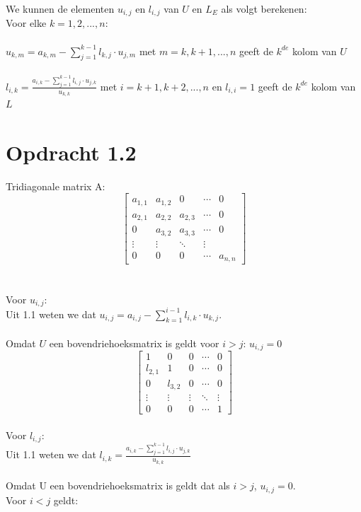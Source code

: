 \documentclass[a4paper]{article}
\begin{document}
We kunnen de elementen $u_{i,j}$ en $ l_{i,j}$ van $U$ en $L_{E}$ als volgt berekenen:
\\Voor elke $k = 1,2,...,n:$
\\{}
\\ \textbullet { } $u_{k,m} = a_{k,m} - \sum_{j=1}^{k-1}l_{k,j} \cdot u_{j,m} $ met $m = k,k+1,...,n$ geeft de $k^{de}$ kolom van $U$
\\{}
\\ \textbullet { } $l_{i,k} = \frac{a_{i,k}-  \sum_{j=1}^{k-1}l_{i,j} \cdot u_{j,k}}{u_{k,k}}$ met $i = k+1,k+2,...,n$ en $l_{i,i} = 1$ geeft de $k^{de}$ kolom van $L$
%
%
%
%
%
%
\section*{Opdracht 1.2}
Tridiagonale matrix A:
\[ \begin{bmatrix}
  a_{1,1} & a_{1,2}& 0 & \cdots &0 \\
  a_{2,1} & a_{2,2}&a_{2,3} & \cdots &0 \\
 0 & a_{3,2}&a_{3,3} & \cdots &0 \\
  \vdots  & \vdots  & \ddots & \vdots  \\
 0 & 0 &0 & \cdots & a_{n,n} 
 \end{bmatrix}\]
\\{}
\\Voor $u_{i,j}$:
\\ Uit 1.1 weten we dat  $u_{i,j} = a_{i,j} - \sum_{k=1}^{i-1}l_{i,k} \cdot u_{k,j}$.
\\{}
\\Omdat $U$ een bovendriehoeksmatrix is geldt voor $i>j$: $u_{i,j} = 0$
\[
\begin{bmatrix}
 1 & 0 & 0& \cdots & 0 \\
  l_{2,1} &1 &0& \cdots &0 \\
0 &l_{3,2} &0& \cdots &0 \\
    \vdots  &\vdots  & \vdots  & \ddots & \vdots  \\
0 &0&0 & \cdots & 1 
\end{bmatrix}
\]
\\Voor $l_{i,j}$:
\\Uit 1.1 weten we dat $l_{i,k} = \frac{a_{i,k}-  \sum_{j=1}^{k-1}l_{i,j} \cdot u_{j,k}}{u_{k,k}}$
\\{}
\\Omdat U een bovendriehoeksmatrix is geldt dat als $i>j$, $u_{i,j} = 0$.
\\Voor $i<j$ geldt: 
\\
\end{document}
